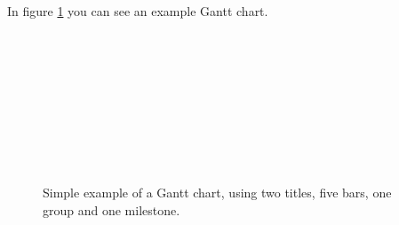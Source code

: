 \documentclass{article}
\begin{document}
 In figure \ref{fig-gantt} you can see an example Gantt chart.
 \begin{figure}
 \centering
    \begin{ganttchart}{1}{11}
       \\
       \\
       \\
       \\
       \\
       \\
       \\
       \\
    \end{ganttchart}
  \caption{Simple example of a Gantt chart, using two titles, five bars, one group and one milestone.}
  \label{fig-gantt}
\end{figure}
\end{document}
